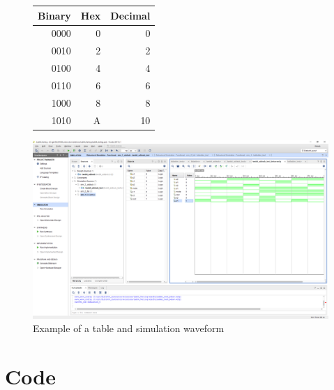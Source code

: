 \documentclass[11pt]{article}
\newcommand{\Verilog}[2][]{%
	
}
\begin{document}
\begin{figure}[ht]\centering
	\begin{tabular}{r|r|r}
		Binary & Hex & Decimal \\
		\midrule
		0000 & 0 & 0 \\
		0010 & 2 & 2 \\
	
		0100 & 4 & 4 \\
		0110 & 6 & 6 \\
		
		1000 & 8 & 8 \\
		1010 & A & 10 \\
		
		
		\bottomrule
	\end{tabular}\medskip



\includegraphics[scale=.5,trim={530 450 30 110},clip]{lab1_example_screenshot}
\caption{Example of a table and simulation waveform}
\end{figure}







\section*{Code}
\Verilog[caption=File-included Verilog code example,label=code:file_ex]{lab1_example_code.sv}
\end{document}
